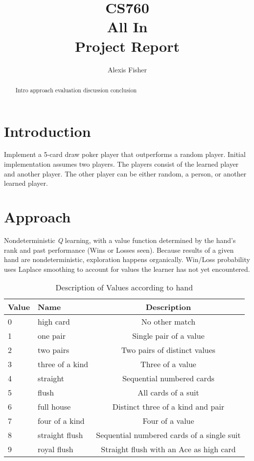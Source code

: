 \documentclass[12pt,pdftex,twocolumn]{article}
\title{CS760 \\ All In \\ Project Report }
\author{  Alexis Fisher }
\begin{document}
\ifpdf
{}
\else
{}
\fi
\maketitle
\begin{abstract}
Intro approach evaluation discussion conclusion
\end{abstract}
\section{Introduction}
Implement a 5-card draw poker player that outperforms a random player. Initial implementation assumes two players. The players consist of the learned player and another player. The other player can be either random, a person, or another learned player. 

\section{Approach}
Nondeterministic \emph{Q} learning, with a value function determined by the hand's rank and past performance (Wins or Losses seen).
Because results of a given hand are nondeterministic, exploration happens organically. 
Win/Loss probability uses Laplace smoothing to account for values the learner has not yet encountered.
\begin{table*}[ht]
\centering
	\begin{tabular}{| l | l | c |}
\hline
\textbf{Value} & \textbf{Name} & \textbf{Description} \\
\hline
0 & high card & No other match \\
1 & one pair & Single pair of a value\\
2 & two pairs & Two pairs of distinct values\\
3 & three of a kind & Three of a value\\
4 & straight & Sequential numbered cards\\
5 & flush & All cards of a suit\\
6 & full house & Distinct three of a kind and pair\\
7 & four of a kind & Four of a value\\
8 & straight flush & Sequential numbered cards of a single suit\\
9 & royal flush & Straight flush with an Ace as high card\\
\hline
\end{tabular}
\label{tab:cardvalues}
\caption{Description of Values according to hand}
\end{table*}
\end{document}
